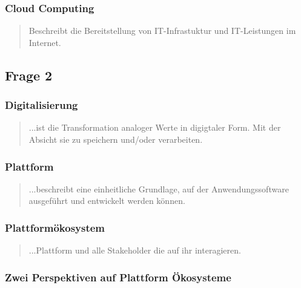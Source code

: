 \documentclass[a4paper]{article}
\newenvironment*{dummyenv}{}{}
\begin{document}
			\subsubsection{Cloud Computing}
			\begin{quote}
				Beschreibt die Bereitstellung von IT-Infrastuktur und IT-Leistungen im Internet.
			\end{quote}
			\hrulefill
			
			\subsection{Frage 2}
			\label{le2-2}
			\subsubsection{Digitalisierung}
			\begin{quote}
				...ist die Transformation analoger Werte in digigtaler Form. Mit der Absicht sie zu speichern und/oder verarbeiten.
			\end{quote}
			
			\subsubsection{Plattform}
			\begin{quote}
				...beschreibt eine einheitliche Grundlage, auf der Anwendungssoftware ausgeführt und entwickelt werden können.
			\end{quote}
			
			\subsubsection{Plattformökosystem}
			\begin{quote}
				...Plattform und alle Stakeholder die auf ihr interagieren.
			\end{quote}
			\hrulefill
			
			\subsubsection{Zwei Perspektiven auf Plattform Ökosysteme}
			
\end{document}
